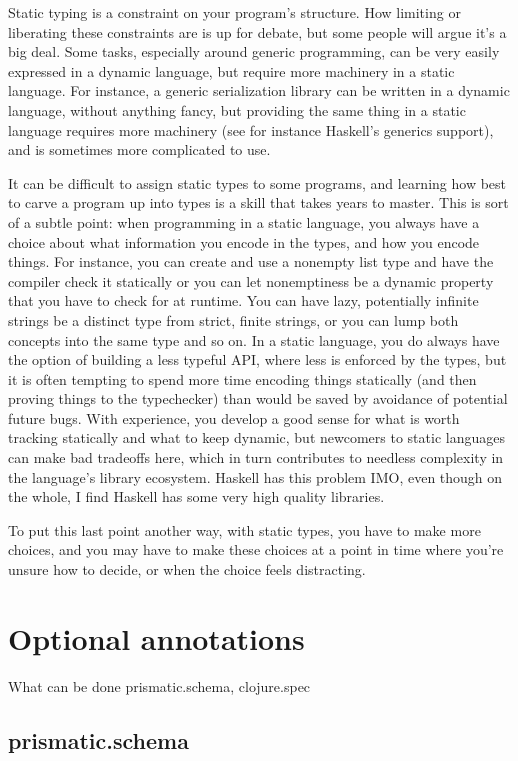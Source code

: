 Static typing is a constraint on your program’s structure. How limiting or
liberating these constraints are is up for debate, but some people will argue
it’s a big deal. Some tasks, especially around generic programming, can be very
easily expressed in a dynamic language, but require more machinery in a static
language. For instance, a generic serialization library can be written in a
dynamic language, without anything fancy, but providing the same thing in a
static language requires more machinery (see for instance Haskell’s generics
support), and is sometimes more complicated to use.

It can be difficult to assign static types to some programs, and learning how
best to carve a program up into types is a skill that takes years to master.
This is sort of a subtle point: when programming in a static language, you
always have a choice about what information you encode in the types, and how you
encode things. For instance, you can create and use a nonempty list type and
have the compiler check it statically or you can let nonemptiness be a dynamic
property that you have to check for at runtime. You can have lazy, potentially
infinite strings be a distinct type from strict, finite strings, or you can lump
both concepts into the same type and so on. In a static language, you do always
have the option of building a less typeful API, where less is enforced by the
types, but it is often tempting to spend more time encoding things statically
(and then proving things to the typechecker) than would be saved by avoidance of
potential future bugs. With experience, you develop a good sense for what is
worth tracking statically and what to keep dynamic, but newcomers to static
languages can make bad tradeoffs here, which in turn contributes to needless
complexity in the language’s library ecosystem. Haskell has this problem IMO,
even though on the whole, I find Haskell has some very high quality libraries.

To put this last point another way, with static types, you have to make more
choices, and you may have to make these choices at a point in time where you’re
unsure how to decide, or when the choice feels distracting.

\section{Optional annotations}
What can be done prismatic.schema, clojure.spec

\subsection{prismatic.schema}

